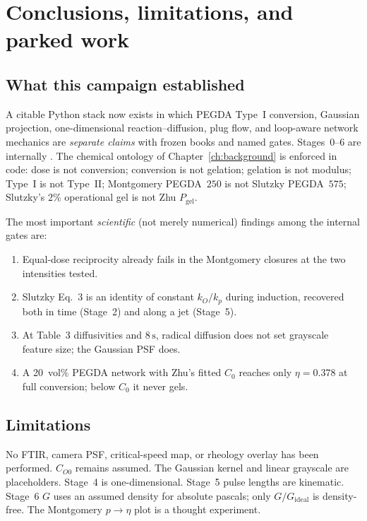 \chapter{Conclusions, limitations, and parked work}
\label{ch:conclusions}

\section{What this campaign established}

A citable Python stack now exists in which PEGDA Type~I conversion, Gaussian projection, one-dimensional reaction--diffusion, plug flow, and loop-aware network mechanics are \emph{separate claims} with frozen books and named gates.
Stages~0--6 are internally \tagvalid.
The chemical ontology of Chapter~\ref{ch:background} is enforced in code: dose is not conversion; conversion is not gelation; gelation is not modulus; Type~I is not Type~II; Montgomery PEGDA~$250$ is not Slutzky PEGDA~$575$; Slutzky's $2\%$ operational gel is not Zhu $P_{\mathrm{gel}}$.

The most important \emph{scientific} (not merely numerical) findings among the internal gates are:

\begin{enumerate}
  \item Equal-dose reciprocity already fails in the Montgomery closures at the two intensities tested.
  \item Slutzky Eq.~3 is an identity of constant $k_O/k_p$ during induction, recovered both in time (Stage~2) and along a jet (Stage~5).
  \item At Table~3 diffusivities and $8\,\mathrm{s}$, radical diffusion does not set grayscale feature size; the Gaussian PSF does.
  \item A 20~vol\% PEGDA network with Zhu's fitted $C_0$ reaches only $\eta=0.378$ at full conversion; below $C_0$ it never gels.
\end{enumerate}

\section{Limitations}

No FTIR, camera PSF, critical-speed map, or rheology overlay has been performed.
$C_{O0}$ remains assumed.
The Gaussian kernel and linear grayscale are placeholders.
Stage~4 is one-dimensional.
Stage~5 pulse lengths are kinematic.
Stage~6 $G$ uses an assumed density for absolute pascals; only $G/G_{\mathrm{ideal}}$ is density-free.
The Montgomery $p\to\eta$ plot is a thought experiment.

